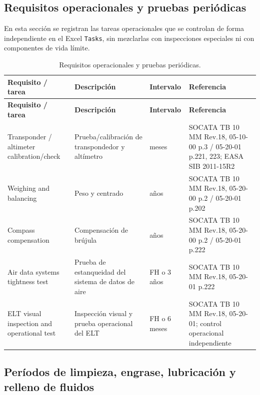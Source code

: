 \documentclass[12pt]{article}
\newcommand{\FH}{FH}
\begin{document}
\subsection{Requisitos operacionales y pruebas periódicas}
\label{subsec:requisitos-operacionales}

En esta sección se registran las tareas operacionales que se controlan de forma independiente en el Excel \texttt{Tasks}, sin mezclarlas con inspecciones especiales ni con componentes de vida límite.

\begingroup
\small
\setlength{\tabcolsep}{4pt}
\renewcommand{\arraystretch}{1.18}
\begin{longtable}{|>{\raggedright\arraybackslash}p{}|>{\raggedright\arraybackslash}p{}|>{\raggedright\arraybackslash}p{}|>{\raggedright\arraybackslash}p{}|}
\caption{Requisitos operacionales y pruebas periódicas.}
\label{tab:requisitos-operacionales}\\
\hline
\textbf{Requisito / tarea} & \textbf{Descripción} & \textbf{Intervalo} & \textbf{Referencia} \\
\hline
\endfirsthead
\hline
\textbf{Requisito / tarea} & \textbf{Descripción} & \textbf{Intervalo} & \textbf{Referencia} \\
\hline
\endhead
Transponder / altimeter calibration/check & Prueba/calibración de transpondedor y altímetro & 24 meses & SOCATA TB 10 MM Rev.18, 05-10-00 p.3 / 05-20-01 p.221, 223; EASA SIB 2011-15R2 \\
\hline
Weighing and balancing & Peso y centrado & 5 años & SOCATA TB 10 MM Rev.18, 05-20-00 p.2 / 05-20-01 p.202 \\
\hline
Compass compensation & Compensación de brújula & 3 años & SOCATA TB 10 MM Rev.18, 05-20-00 p.2 / 05-20-01 p.222 \\
\hline
Air data systems tightness test & Prueba de estanqueidad del sistema de datos de aire & 300 \FH{} o 3 años & SOCATA TB 10 MM Rev.18, 05-20-01 p.222 \\
\hline
ELT visual inspection and operational test & Inspección visual y prueba operacional del ELT & 100 \FH{} o 6 meses & SOCATA TB 10 MM Rev.18, 05-20-01; control operacional independiente \\
\hline
\end{longtable}
\endgroup

\subsection{Períodos de limpieza, engrase, lubricación y relleno de fluidos}
\label{subsec:servicing}
\end{document}
